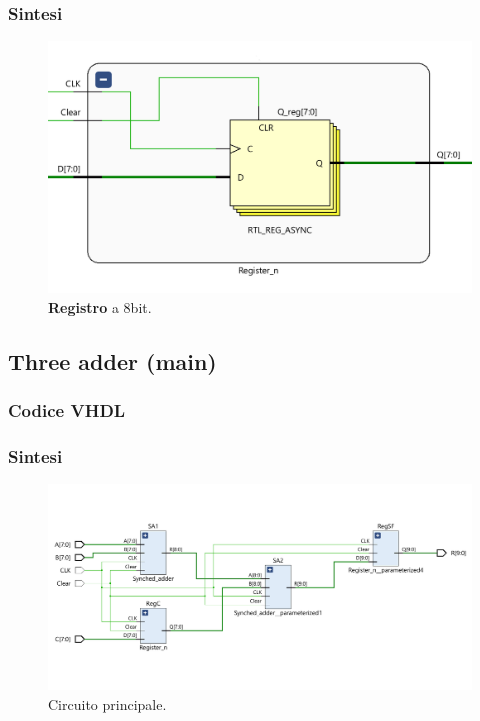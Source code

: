 \documentclass[12pt]{article}
\begin{document}
        \subsubsection{Sintesi}
            \begin{figure}[ht]
                \centering
                \includegraphics[scale=0.45]{Register.png}
                \caption{\textbf{Registro} a 8bit.}
            \end{figure}

    \subsection{Three adder (main)}

        \subsubsection{Codice VHDL}
            
        
        \subsubsection{Sintesi}
            \begin{figure}[ht]
                \centering
                \includegraphics[scale=0.45]{main.png}
                \caption{Circuito principale.}
            \end{figure}
\end{document}

